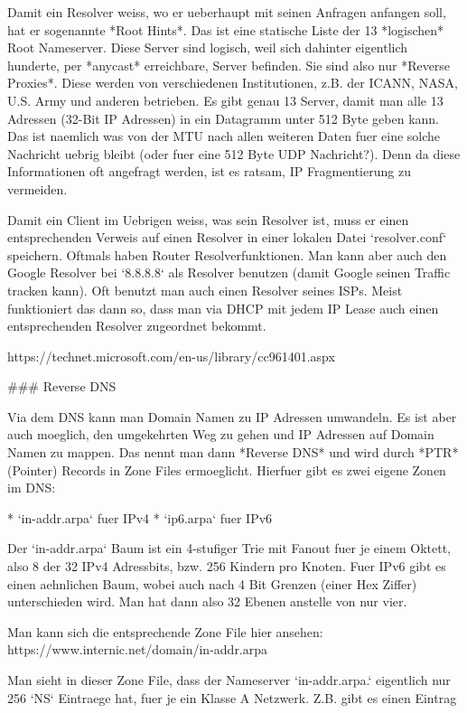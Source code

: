 Damit ein Resolver weiss, wo er ueberhaupt mit seinen Anfragen anfangen soll,
hat er sogenannte *Root Hints*. Das ist eine statische Liste der 13 *logischen*
Root Nameserver. Diese Server sind logisch, weil sich dahinter eigentlich
hunderte, per *anycast* erreichbare, Server befinden. Sie sind also nur *Reverse
Proxies*. Diese werden von verschiedenen Institutionen, z.B. der ICANN, NASA,
U.S. Army und anderen betrieben. Es gibt genau 13 Server, damit man alle 13
Adressen (32-Bit IP Adressen) in ein Datagramm unter 512 Byte geben kann. Das
ist naemlich was von der MTU nach allen weiteren Daten fuer eine solche
Nachricht uebrig bleibt (oder fuer eine 512 Byte UDP Nachricht?). Denn da diese
Informationen oft angefragt werden, ist es ratsam, IP Fragmentierung zu
vermeiden.

Damit ein Client im Uebrigen weiss, was sein Resolver ist, muss er einen
entsprechenden Verweis auf einen Resolver in einer lokalen Datei `resolver.conf`
speichern. Oftmals haben Router Resolverfunktionen. Man kann aber auch den
Google Resolver bei `8.8.8.8` als Resolver benutzen (damit Google seinen Traffic
tracken kann). Oft benutzt man auch einen Resolver seines ISPs. Meist
funktioniert das dann so, dass man via DHCP mit jedem IP Lease auch einen
entsprechenden Resolver zugeordnet bekommt.

https://technet.microsoft.com/en-us/library/cc961401.aspx

### Reverse DNS

Via dem DNS kann man Domain Namen zu IP Adressen umwandeln. Es ist aber auch
moeglich, den umgekehrten Weg zu gehen und IP Adressen auf Domain Namen zu
mappen. Das nennt man dann *Reverse DNS* und wird durch *PTR* (Pointer) Records
in Zone Files ermoeglicht. Hierfuer gibt es zwei eigene Zonen im DNS:

* `in-addr.arpa` fuer IPv4
* `ip6.arpa` fuer IPv6

Der `in-addr.arpa` Baum ist ein 4-stufiger Trie mit Fanout fuer je einem Oktett,
also 8 der 32 IPv4 Adressbits, bzw. 256 Kindern pro Knoten. Fuer IPv6 gibt es
einen aehnlichen Baum, wobei auch nach 4 Bit Grenzen (einer Hex Ziffer)
unterschieden wird. Man hat dann also 32 Ebenen anstelle von nur vier.

Man kann sich die entsprechende Zone File hier ansehen:
https://www.internic.net/domain/in-addr.arpa

Man sieht in dieser Zone File, dass der Nameserver `in-addr.arpa.` eigentlich
nur 256 `NS` Eintraege hat, fuer je ein Klasse A Netzwerk. Z.B. gibt es einen
Eintrag

